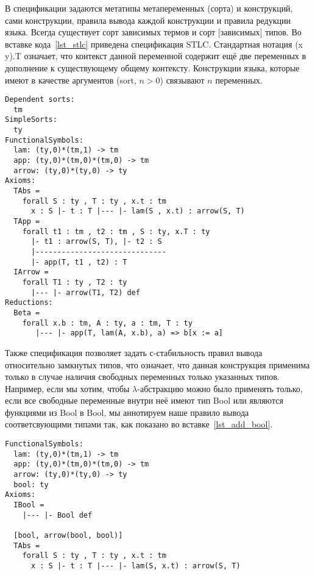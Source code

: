 В спецификации задаются метатипы метапеременных (сорта) и конструкций, сами конструкции, правила вывода каждой конструкции и правила редукции языка. Всегда существует сорт зависимых термов и сорт [зависимых] типов. Во вставке кода~\ref{lst_stlc} приведена спецификация STLC\cite{stlc}. Стандартная нотация (x y).T означает, что контекст данной переменной содержит ещё две переменных в дополнение к существующему общему контексту. Конструкции языка, которые имеют в качестве аргументов (sort, $n > 0$) связывают $n$ переменных.

\begin{lstlisting}[label={lst_stlc}, caption={Описание STLC при помощи языка специфкаций},captionpos=b, frame=single, float, floatplacement=H]
Dependent sorts:
  tm
SimpleSorts:
  ty
FunctionalSymbols:
  lam: (ty,0)*(tm,1) -> tm
  app: (ty,0)*(tm,0)*(tm,0) -> tm
  arrow: (ty,0)*(ty,0) -> ty
Axioms:
  TAbs =
    forall S : ty , T : ty , x.t : tm
      x : S |- t : T |--- |- lam(S , x.t) : arrow(S, T)
  TApp =
    forall t1 : tm , t2 : tm , S : ty, x.T : ty
      |- t1 : arrow(S, T), |- t2 : S
      |------------------------------
      |- app(T, t1 , t2) : T
  IArrow =
    forall T1 : ty , T2 : ty
      |--- |- arrow(T1, T2) def
Reductions:
  Beta =
    forall x.b : tm, A : ty, a : tm, T : ty
       |--- |- app(T, lam(A, x.b), a) => b[x := a]
\end{lstlisting}

Также спецификация позволяет задать с-стабильность правил вывода относительно замкнутых типов, что означает, что данная конструкция применима только в случае наличия свободных переменных только указанных типов. Например, если мы хотим, чтобы $\lambda$-абстракцию можно было применять только, если все свободные переменные внутри неё имеют тип Bool или являются функциями из Bool в Bool, мы аннотируем наше правило вывода соответсвующими типами так, как показано во вставке~\ref{lst_add_bool}.

\begin{lstlisting}[label={lst_add_bool}, caption={Пример спецификации того, что конструкция $\lambda$ должна быть стабильна относительно типа Bool и Bool $\rightarrow$ Bool},captionpos=b, frame=single, float, floatplacement=H]
FunctionalSymbols:
  lam: (ty,0)*(tm,1) -> tm
  app: (ty,0)*(tm,0)*(tm,0) -> tm
  arrow: (ty,0)*(ty,0) -> ty
  bool: ty
Axioms:
  IBool =
    |--- |- Bool def

  [bool, arrow(bool, bool)]
  TAbs =
    forall S : ty , T : ty , x.t : tm
      x : S |- t : T |--- |- lam(S, x.t) : arrow(S, T)
\end{lstlisting}

